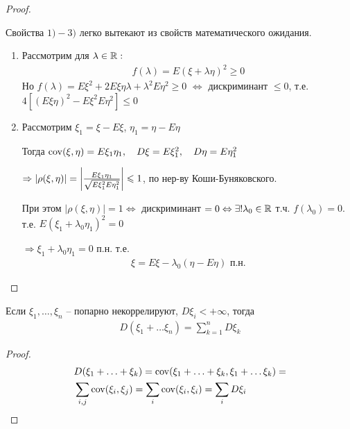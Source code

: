 \begin{proof}~

  Свойства $1) - 3)$ легко вытекают из свойств математического ожидания.

  \begin{enumerate}[start=4]
    \item 
      Рассмотрим для $\lambda \in \mathbb{R}:$
      \begin{align*}
        f(\lambda) = E(\xi + \lambda \eta)^2 \geq 0
      \end{align*}
      Но $f(\lambda) = E \xi^2 + 2E \xi \eta \lambda + \lambda^2 E \eta^2 \geq 0$
      $\Leftrightarrow$ дискриминант $\leq 0$, т.е.
      $4 [(E \xi \eta)^2 - E \xi^2 E\eta^2] \leq 0$

    \item 
      Рассмотрим $\xi_1 = \xi - E \xi$, $\eta_1 = \eta - E \eta$

      Тогда $\operatorname{cov}(\xi, \eta) = E \xi_1 \eta_1,\quad D \xi = E \xi_1^2,\quad D \eta = E\eta_1^2$

      $\Rightarrow |\rho(\xi, \eta)| = 
      \left | \frac{E \xi_1 \eta_1}{\sqrt{E \xi_1^2 E\eta_1^2}} \right | \leqslant 1$, 
      по нер-ву Коши-Буняковского.

      При этом $|\rho(\xi, \eta)| = 1 \Leftrightarrow$ дискриминант $= 0 
      \Leftrightarrow \exists ! \lambda_0 \in \mathbb{R}$ т.ч. $f(\lambda_0) = 0$. 
      т.е. $E(\xi_1 + \lambda_0 \eta_1)^2 = 0$

      $\Rightarrow \xi_1 + \lambda_0 \eta_1 = 0$ п.н. т.е.
      \begin{align*}
        \xi = E \xi - \lambda_0 (\eta - E \eta) \text{ п.н.}
      \end{align*}
  \end{enumerate}
\end{proof}

\begin{corollary}
  Если $\xi_1, \ldots, \xi_n$ -- попарно некоррелируют, $D \xi_i < +\infty$, тогда
  \begin{align*}
    D(\xi_1 + \ldots \xi_n) = \sum_{k = 1}^{n} D\xi_k
  \end{align*}
\end{corollary}

\begin{proof}
  \begin{align*}
    &D(\xi_1 + \ldots + \xi_k) = \operatorname{cov}(\xi_1 + \ldots + \xi_k, \xi_1 + \ldots \xi_k) =\\
    &\sum_{i, j} \operatorname{cov}(\xi_i, \xi_j) = \sum_i \operatorname{cov}(\xi_i, \xi_i) = \sum_{i} D \xi_i
  \end{align*}
\end{proof}

